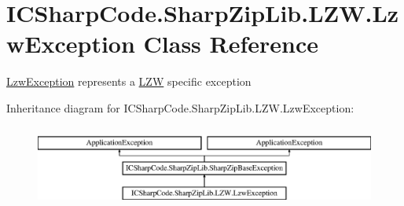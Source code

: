 \hypertarget{class_i_c_sharp_code_1_1_sharp_zip_lib_1_1_l_z_w_1_1_lzw_exception}{}\section{I\+C\+Sharp\+Code.\+Sharp\+Zip\+Lib.\+L\+Z\+W.\+Lzw\+Exception Class Reference}
\label{class_i_c_sharp_code_1_1_sharp_zip_lib_1_1_l_z_w_1_1_lzw_exception}


\hyperlink{class_i_c_sharp_code_1_1_sharp_zip_lib_1_1_l_z_w_1_1_lzw_exception}{Lzw\+Exception} represents a \hyperlink{namespace_i_c_sharp_code_1_1_sharp_zip_lib_1_1_l_z_w}{L\+ZW} specific exception  


Inheritance diagram for I\+C\+Sharp\+Code.\+Sharp\+Zip\+Lib.\+L\+Z\+W.\+Lzw\+Exception\+:\begin{figure}[H]
\begin{center}
\leavevmode
\includegraphics[height=2.709677cm]{class_i_c_sharp_code_1_1_sharp_zip_lib_1_1_l_z_w_1_1_lzw_exception}
\end{center}
\end{figure}
